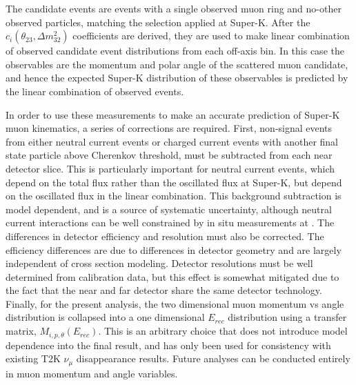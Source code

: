 
The \nuprism candidate events are events with a single observed muon ring and no-other observed particles, matching the selection applied at Super-K.  After the $c_i\left(\theta_{23},\Delta m^2_{32}\right)$  coefficients are derived, they are used to make linear combination of observed candidate event distributions from each \nuprism off-axis bin.  In this case the observables are the momentum and polar angle of the scattered muon candidate, and hence the expected Super-K distribution of these observables is predicted by the linear combination of observed \nuprism events.

In order to use these \nuprismlite measurements to make an accurate prediction of Super-K muon kinematics, a series of corrections are required. First, non-signal events from either neutral current events or charged current events with another final state particle above Cherenkov threshold, must be subtracted from each near detector slice. This is particularly important for neutral current events, which depend on the total flux rather than the oscillated flux at Super-K, but depend on the oscillated flux in the \nuprismlite linear combination. This background subtraction is model dependent, and is a source of systematic uncertainty, although neutral current interactions can be well constrained by in situ measurements at \nuprismlite. The differences in detector efficiency and resolution must also be corrected. The efficiency differences are due to differences in detector geometry and are largely independent of cross section modeling. Detector resolutions must be well determined from calibration data, but this effect is somewhat mitigated due to the fact that the near and far detector share the same detector technology. Finally, for the present analysis, the two dimensional muon momentum vs angle distribution is collapsed into a one dimensional $E_{rec}$ distribution using a transfer matrix, $M_{i,p,\theta}\left(E_{rec}\right)$. This is an arbitrary choice that does not introduce model dependence into the final result, and has only been used for consistency with existing T2K $\nu_\mu$ disappearance results. Future analyses can be conducted entirely in muon momentum and angle variables.

